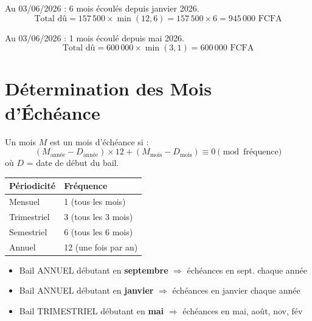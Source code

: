 \documentclass[a4paper,12pt]{article}
\begin{document}
\begin{exemplebox}
Au 03/06/2026 : 6 mois écoulés depuis janvier 2026.
$$\text{Total dû} = 157\,500 \times \min(12, 6) = 157\,500 \times 6 = 945\,000 \text{ FCFA}$$
\end{exemplebox}

\begin{exemplebox}
Au 03/06/2026 : 1 mois écoulé depuis mai 2026.
$$\text{Total dû} = 600\,000 \times \min(3, 1) = 600\,000 \text{ FCFA}$$
\end{exemplebox}

\section{Détermination des Mois d'Échéance}

\begin{formulebox}
Un mois $M$ est un mois d'échéance si :
\begin{equation}
(M_{\text{année}} - D_{\text{année}}) \times 12 + (M_{\text{mois}} - D_{\text{mois}}) \equiv 0 \pmod{\text{fréquence}}
\end{equation}
où $D$ = date de début du bail.

\vspace{0.2cm}
\begin{tabular}{ll}
\toprule
\textbf{Périodicité} & \textbf{Fréquence} \\
\midrule
Mensuel & 1 (tous les mois) \\
Trimestriel & 3 (tous les 3 mois) \\
Semestriel & 6 (tous les 6 mois) \\
Annuel & 12 (une fois par an) \\
\bottomrule
\end{tabular}
\end{formulebox}

\begin{exemplebox}[Exemples]
\begin{itemize}
  \item Bail ANNUEL débutant en \textbf{septembre} $\Rightarrow$ échéances en sept. chaque année
  \item Bail ANNUEL débutant en \textbf{janvier} $\Rightarrow$ échéances en janvier chaque année
  \item Bail TRIMESTRIEL débutant en \textbf{mai} $\Rightarrow$ échéances en mai, août, nov, fév
\end{itemize}
\end{exemplebox}
\end{document}
